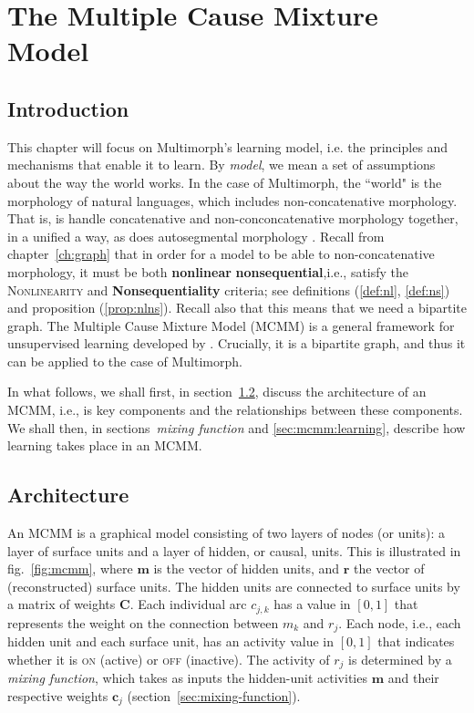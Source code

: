 \chapter{The Multiple Cause Mixture Model}
\label{ch:MCMM}

\section{Introduction}
\label{sec:mcmm:intro}
This chapter will focus on Multimorph's learning model, i.e. the principles and mechanisms that
enable it to learn. By \emph{model}, 
we mean a set of assumptions about the way the world works. In the case of Multimorph, 
the ``world" is the morphology of natural languages, which includes non-concatenative morphology. 
That is, is handle concatenative and non-conconcatenative morphology together, 
in a unified a way, as does
autosegmental morphology \citep{mccarthy:1981}. Recall from chapter~\ref{ch:graph} 
that in order
for a model to be able to non-concatenative morphology, it must be both \textbf{nonlinear}
 \textbf{nonsequential},i.e., satisfy the \textsc{Nonlinearity} and \textbf{Nonsequentiality} 
 criteria; 
 see definitions (\ref{def:nl}, \ref{def:ns}) and 
 proposition (\ref{prop:nlns}). Recall also that this 
 means that we need a bipartite graph. The Multiple Cause Mixture Model (MCMM) is a general 
 framework for unsupervised learning developed by \cite{saund:1994}. Crucially, it is 
 a bipartite graph, and thus it can be
applied to the case of Multimorph.  

In what follows, we shall first, in section~\ref{sec:architecture}, discuss the architecture of an \ac{MCMM},
i.e., is key components and the relationships between these components. We shall then, in 
sections~\emph{mixing function} and \ref{sec:mcmm:learning}, describe how
learning takes place in an \ac{MCMM}. 

\section{Architecture}
\label{sec:architecture}
An MCMM is a graphical model consisting of two layers of nodes (or units): a layer 
of surface units 
and a layer of hidden, 
or causal, units. This is illustrated in fig.~\ref{fig:mcmm}, where $\mathbf{m}$ 
is the vector of hidden units, and $\mathbf{r}$ the vector of (reconstructed) surface units.
The hidden units are connected to surface units by a matrix of weights $\mathbf{C}$. 
Each individual arc $c_{j,k}$ has a value in $[0,1]$ that represents the weight on the connection between
$m_k$ and $r_j$.
Each node, i.e., each hidden unit and each surface unit, has an activity value in $[0,1]$ that
indicates whether it is \textsc{on} (active) or \textsc{off} (inactive).
The activity of $r_j$ is determined by a \emph{mixing function}, which takes as inputs the 
hidden-unit activities $\mathbf{m}$ and their respective weights $\mathbf{c}_j$
(section~\ref{sec:mixing-function}).

